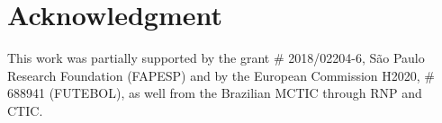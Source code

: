 \documentclass[conference]{IEEEtran}
\begin{document}










\section*{Acknowledgment}

This work was partially supported by the grant \# 2018/02204-6, São Paulo Research Foundation (FAPESP) and by the European Commission H2020, \# 688941 (FUTEBOL), as well from the Brazilian MCTIC through RNP and CTIC.

\begin{small}
    
    
\end{small}

\vspace{12pt}
\end{document}
